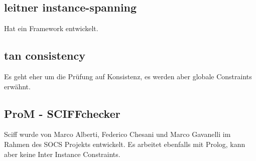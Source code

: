 \subsection{leitner instance-spanning}
Hat ein Framework entwickelt.
\subsection{tan consistency}
Es geht eher um die Prüfung auf Konsistenz, es werden aber globale Constraints erwähnt.




\subsection{ProM - SCIFFchecker}
Sciff wurde von Marco Alberti, Federico Chesani und Marco Gavanelli im Rahmen des SOCS Projekts entwickelt. Es arbeitet ebenfalls mit Prolog, kann aber keine Inter Instance Constraints.



